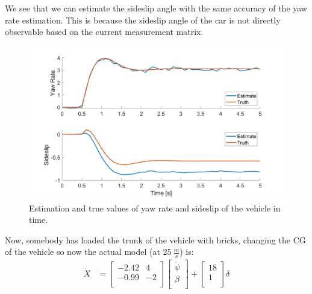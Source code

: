 \documentclass[12pt,letterpaper, onecolumn]{exam}
\begin{document}
\begin{questions}
\begin{parts}
{{                We see that we can estimate the sideslip angle with the same accuracy of the yaw rate estimation. This is because the sideslip angle of the car is not directly observable based on the current measurement matrix.
                \begin{figure}[!h]
                    \centering
                    \includegraphics[width=\linewidth]{Q4a.png}
                    \caption{Estimation and true values of yaw rate and sideslip of the vehicle in time.}
                    \label{fig:Q4a}
                \end{figure}
            }
            \clearpage
            Now, somebody has loaded the trunk of the vehicle with bricks, changing the CG of the vehicle so now the actual model (at $25~\frac{m}{s}$) is:
            \begin{equation*}
                \begin{split}
                    \dot{X} & =
                    \begin{bmatrix}
                        -2.42 & 4  \\
                        -0.99 & -2 \\
                    \end{bmatrix}
                    \begin{bmatrix}
                        \dot{\psi} \\
                        \beta      \\
                    \end{bmatrix} +
                    \begin{bmatrix}
                        18 \\
                        1  \\
                    \end{bmatrix} \delta\\

\end{split}
\end{equation*}}
\end{parts}
\end{questions}
\end{document}
